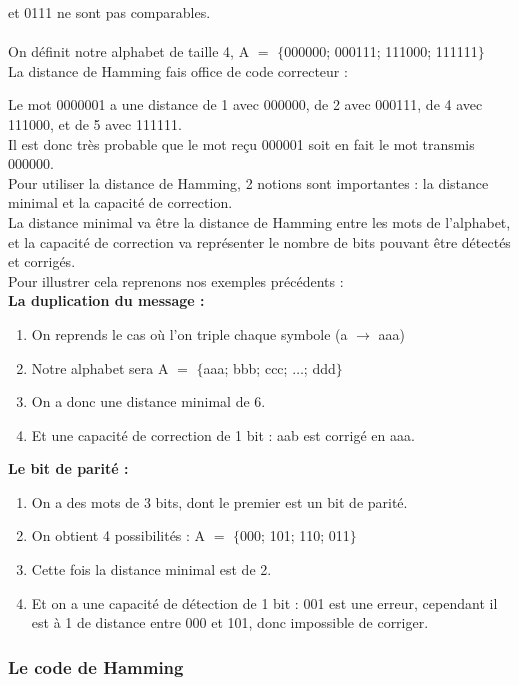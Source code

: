  et 0111 ne sont pas comparables.
\\
\\ On définit notre alphabet de taille 4, A $=$ $\{$000000; 000111; 111000; 111111$\}$
\\ La distance de Hamming fais office de code correcteur :

\tab Le mot 0000001 a une distance de 1 avec 000000, de 2 avec 000111, de 4 avec 111000, et de 5 avec 111111.
\\ Il est donc très probable que le mot reçu 000001 soit en fait le mot transmis 000000.
\\

\tab Pour utiliser la distance de Hamming, 2 notions sont importantes : la distance minimal et la capacité de correction.
\\ La distance minimal va être la distance de Hamming entre les mots de l’alphabet, et la capacité de correction va représenter le nombre de bits pouvant être détectés et corrigés.
\\

\tab Pour illustrer cela reprenons nos exemples précédents :
\\
\textbf{La duplication du message :}
\begin{enumerate}
  \item[] On reprends le cas où l’on triple chaque symbole (a $\rightarrow$ aaa)
  \item[] Notre alphabet sera A $=$ $\{$aaa; bbb; ccc; $\ldots$; ddd$\}$
  \item[] On a donc une distance minimal de 6.
  \item[] Et une capacité de correction de 1 bit : aab est corrigé en aaa.
\end{enumerate}

\linebreak
\textbf{Le bit de parité :}
\begin{enumerate}
  \item[] On a des mots de 3 bits, dont le premier est un bit de parité.
  \item[] On obtient 4 possibilités : A $=$ $\{$000; 101; 110; 011$\}$
  \item[] Cette fois la distance minimal est de 2.
  \item[] Et on a une capacité de détection de 1 bit : 001 est une erreur, cependant il est à 1 de distance entre 000 et 101, donc impossible de corriger.
\end{enumerate}

\subsubsection{Le code de Hamming}
\label{subs:Le code de Hamming}

